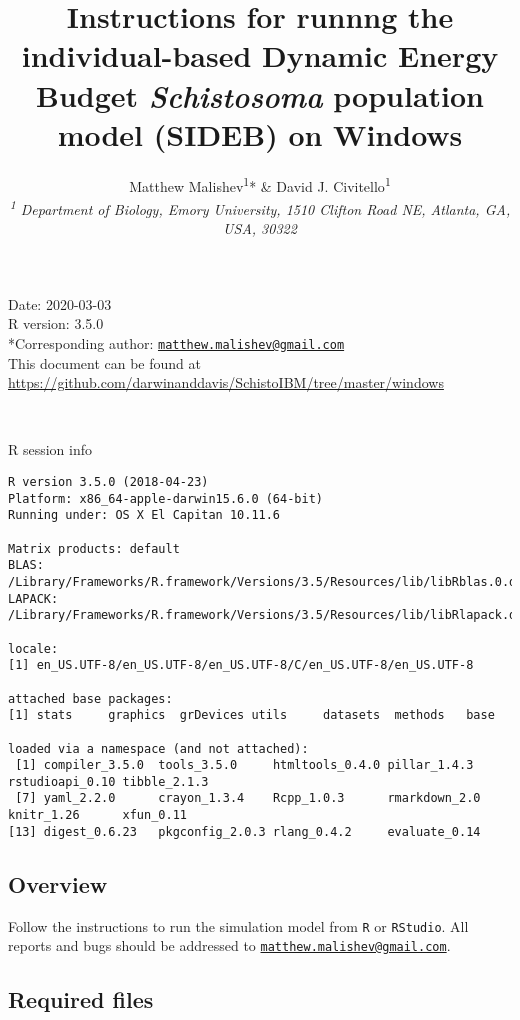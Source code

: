 \documentclass[10,portrait]{article}
\title{Instructions for runnng the individual-based Dynamic Energy Budget
\emph{Schistosoma} population model (SIDEB) on Windows}
\author{Matthew Malishev\textsuperscript{1}* \& David J.
Civitello\textsuperscript{1}\\[2\baselineskip]\emph{\textsuperscript{1}
Department of Biology, Emory University, 1510 Clifton Road NE, Atlanta,
GA, USA, 30322}}
\date{}
\begin{document}
\maketitle

{
\hypersetup{linkcolor=black}
\setcounter{tocdepth}{4}
\tableofcontents
}
\newpage    

Date: 2020-03-03\\
R version: 3.5.0\\
*Corresponding author:
\href{mailto:matthew.malishev@gmail.com}{\nolinkurl{matthew.malishev@gmail.com}}\\
This document can be found at
\url{https://github.com/darwinanddavis/SchistoIBM/tree/master/windows}

~

R session info

\begin{verbatim}
R version 3.5.0 (2018-04-23)
Platform: x86_64-apple-darwin15.6.0 (64-bit)
Running under: OS X El Capitan 10.11.6

Matrix products: default
BLAS: /Library/Frameworks/R.framework/Versions/3.5/Resources/lib/libRblas.0.dylib
LAPACK: /Library/Frameworks/R.framework/Versions/3.5/Resources/lib/libRlapack.dylib

locale:
[1] en_US.UTF-8/en_US.UTF-8/en_US.UTF-8/C/en_US.UTF-8/en_US.UTF-8

attached base packages:
[1] stats     graphics  grDevices utils     datasets  methods   base     

loaded via a namespace (and not attached):
 [1] compiler_3.5.0  tools_3.5.0     htmltools_0.4.0 pillar_1.4.3    rstudioapi_0.10 tibble_2.1.3   
 [7] yaml_2.2.0      crayon_1.3.4    Rcpp_1.0.3      rmarkdown_2.0   knitr_1.26      xfun_0.11      
[13] digest_0.6.23   pkgconfig_2.0.3 rlang_0.4.2     evaluate_0.14  
\end{verbatim}

\newpage  

\subsection{Overview}\label{overview}

Follow the instructions to run the simulation model from \texttt{R} or
\texttt{RStudio}. All reports and bugs should be addressed to
\href{mailto:matthew.malishev@gmail.com}{\nolinkurl{matthew.malishev@gmail.com}}.

\subsection{Required files}\label{required-files}
\end{document}
